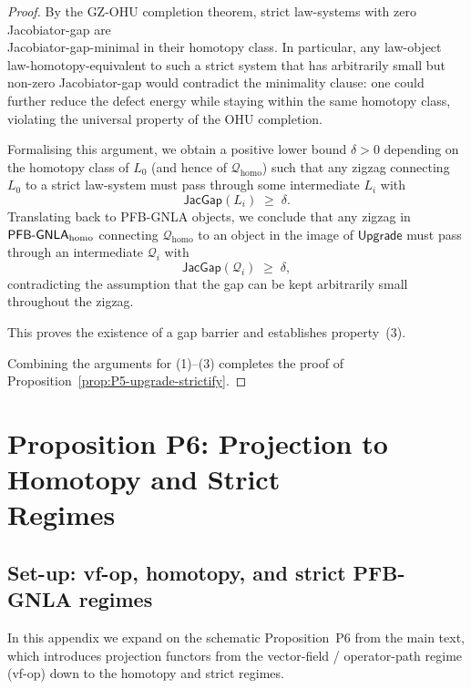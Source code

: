 \documentclass[11pt]{book}
\theoremstyle{plain}
\theoremstyle{definition}
\begin{document}
\begin{proof}
By the GZ-OHU completion theorem, strict law-systems with zero
Jacobiator-gap are \\ Jacobiator-gap-minimal in their homotopy class.  In
particular, any law-object law-homotopy-equivalent to such a strict
system that has arbitrarily small but non-zero Jacobiator-gap would
contradict the minimality clause: one could further reduce the defect
energy while staying within the same homotopy class, violating the
universal property of the OHU completion.

Formalising this argument, we obtain a positive lower bound
\(\delta>0\) depending on the homotopy class of \(L_0\) (and hence of
\(\mathcal{Q}_{\mathrm{homo}}\)) such that any zigzag connecting
\(L_0\) to a strict law-system must pass through some intermediate
\(L_i\) with
\[
  \mathsf{JacGap}(L_i)\;\ge\;\delta.
\]
Translating back to PFB-GNLA objects, we conclude that any zigzag in
\(\mathsf{PFB\text- GNLA}_{\mathrm{homo}}\) connecting
\(\mathcal{Q}_{\mathrm{homo}}\) to an object in the image of
\(\mathsf{Upgrade}\) must pass through an intermediate
\(\mathcal{Q}_i\) with
\[
  \mathsf{JacGap}(\mathcal{Q}_i)\;\ge\;\delta,
\]
contradicting the assumption that the gap can be kept arbitrarily
small throughout the zigzag.

This proves the existence of a gap barrier and establishes
property~\textnormal{(3)}.



\medskip
Combining the arguments for \textnormal{(1)}–\textnormal{(3)} completes
the proof of Proposition~\ref{prop:P5-upgrade-strictify}.
\end{proof}



\section[Proposition P6: Projection to Homotopy and Strict Regimes]{Proposition P6: Projection to Homotopy and Strict \\ Regimes}
\label{app:II-P6}

\subsection*{Set-up: vf-op, homotopy, and strict PFB-GNLA regimes}


In this appendix we expand on the schematic Proposition~P6 from the
main text, which introduces projection functors from the vector-field /
operator-path regime (vf-op) down to the homotopy and strict regimes.
\end{document}

